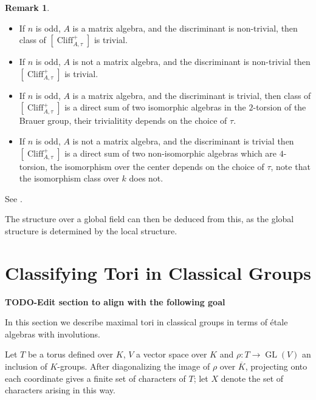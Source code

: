 \documentclass{article}
\theoremstyle{plain}
\theoremstyle{definition}
\newtheorem{remark}[theorem]{Remark}
\numberwithin{equation}{section}
\DeclareMathOperator{\GL}{GL}
\DeclareMathOperator{\Clif}{Cliff}
\newcommand{\Kb}{\overline{K}}
\newcommand{\TODO}[1]{\textbf{TODO-#1}}
\begin{document}
\begin{remark}
\begin{itemize}
\item If $n$ is odd, $A$ is a matrix algebra, and the discriminant is non-trivial, then class of $[\Clif^+_{A,\tau}]$ is trivial.
\item If $n$ is odd, $A$ is not a matrix algebra, and the discriminant is non-trivial then $[\Clif^+_{A,\tau}]$ is trivial.
\item If $n$ is odd, $A$ is a matrix algebra, and the discriminant is trivial, then class of $[\Clif^+_{A,\tau}]$ is a direct sum of two isomorphic algebras in the $2$-torsion of the Brauer group, their trivialitity depends on the choice of $\tau$.
\item If $n$ is odd, $A$ is not a matrix algebra, and the discriminant is trivial then $[\Clif^+_{A,\tau}]$ is a direct sum of two non-isomorphic algebras which are $4$-torsion, the isomorphism over the center depends on the choice of $\tau$, note that the isomorphism class over $k$ does not.
\end{itemize}
See \cite[Thm 9.12]{book_of_involutions}.

The structure over a global field can then be deduced from this, as the global structure is determined by the local structure.
\end{remark}





\section{Classifying Tori in Classical Groups}

\TODO{Edit section to align with the following goal}

In this section we describe maximal tori in classical groups in terms of \'etale algebras with involutions.

Let $T$ be a torus defined over $K$, $V$ a vector space over $K$ and $\rho : T \rightarrow \GL(V)$ an inclusion of $K$-groups.  After diagonalizing the image of $\rho$ over $\Kb$, projecting onto each coordinate gives a finite set of characters of $T$; let $X$ denote the set of characters arising in this way. 
\end{document}
